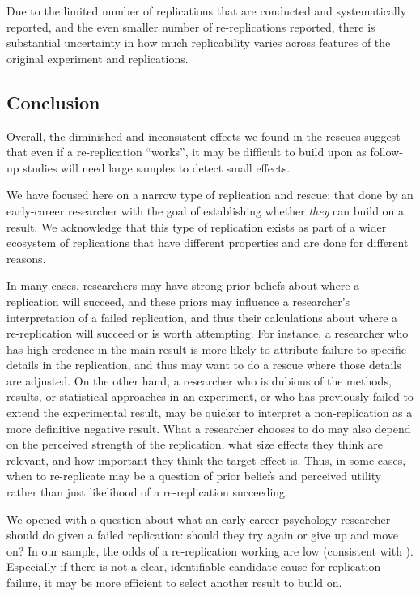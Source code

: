 \documentclass[
  english,
  a4paper,
]{article}
\begin{document}
Due to the limited number of replications that are conducted and systematically reported, and the even smaller number of re-replications reported, there is substantial uncertainty in how much replicability varies across features of the original experiment and replications.

\subsection{Conclusion}\label{conclusion}

Overall, the diminished and inconsistent effects we found in the rescues suggest that even if a re-replication ``works'', it may be difficult to build upon as follow-up studies will need large samples to detect small effects.

We have focused here on a narrow type of replication and rescue: that done by an early-career researcher with the goal of establishing whether \emph{they} can build on a result. We acknowledge that this type of replication exists as part of a wider ecosystem of replications that have different properties and are done for different reasons.

In many cases, researchers may have strong prior beliefs about where a replication will succeed, and these priors may influence a researcher's interpretation of a failed replication, and thus their calculations about where a re-replication will succeed or is worth attempting. For instance, a researcher who has high credence in the main result is more likely to attribute failure to specific details in the replication, and thus may want to do a rescue where those details are adjusted. On the other hand, a researcher who is dubious of the methods, results, or statistical approaches in an experiment, or who has previously failed to extend the experimental result, may be quicker to interpret a non-replication as a more definitive negative result. What a researcher chooses to do may also depend on the perceived strength of the replication, what size effects they think are relevant, and how important they think the target effect is. Thus, in some cases, when to re-replicate may be a question of prior beliefs and perceived utility rather than just likelihood of a re-replication succeeding.

We opened with a question about what an early-career psychology researcher should do given a failed replication: should they try again or give up and move on?
In our sample, the odds of a re-replication working are low (consistent with ).
Especially if there is not a clear, identifiable candidate cause for replication failure, it may be more efficient to select another result to build on.
\end{document}
